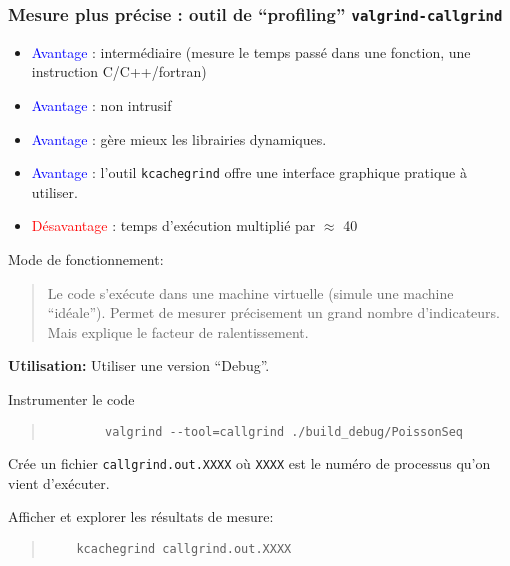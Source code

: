 \documentclass{beamer}
\begin{document}
\begin{frame}
\frametitle{Mesure plus pr\'ecise : outil de ``profiling'' {\tt valgrind-callgrind}}

\begin{itemize}
	\item \textcolor{blue}{Avantage} : interm\'ediaire (mesure le temps pass\'e dans une fonction, une instruction C/C++/fortran)
	\item \textcolor{blue}{Avantage} : non intrusif
	\item \textcolor{blue}{Avantage} : g\`ere mieux les librairies dynamiques.
	\item \textcolor{blue}{Avantage} : l'outil {\tt kcachegrind} offre une interface graphique pratique \`a utiliser.
	\item \textcolor{red}{D\'esavantage} : temps d'ex\'ecution multipli\'e par $\approx$ 40
\end{itemize}
\vfill
\end{frame}

\begin{frame}[fragile]
Mode de fonctionnement:
\begin{quote}
	Le code s'ex\'ecute dans une machine virtuelle (simule une machine ``id\'eale''). Permet de mesurer pr\'ecisement un grand nombre d'indicateurs. Mais explique le facteur de ralentissement.
\end{quote}

{\bf Utilisation:}
Utiliser une version ``Debug''.

\vfill
Instrumenter le code
	\begin{quote}
		\begin{verbatim}
		valgrind --tool=callgrind ./build_debug/PoissonSeq
		\end{verbatim}
	\end{quote}

Cr\'ee un fichier {\tt callgrind.out.XXXX} o\`u {\tt XXXX} est le num\'ero de processus qu'on vient d'ex\'ecuter.

\vfill
Afficher et explorer les r\'esultats de mesure:
\begin{quote}
	\begin{verbatim}
	kcachegrind callgrind.out.XXXX
	\end{verbatim}
\end{quote}
\vfill

\end{frame}
\end{document}
